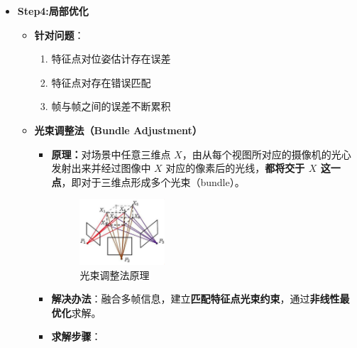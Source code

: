 \documentclass[../main.tex]{subfiles}
\begin{document}
\begin{enumerate}
\begin{itemize}
\begin{enumerate}
\begin{itemize}
                    \item \textbf{Step4:局部优化} 
                        \begin{itemize}
                            \item \textbf{针对问题}：
                                \begin{enumerate}
                                    \item 特征点对位姿估计存在误差
                                    \item 特征点对存在错误匹配
                                    \item 帧与帧之间的误差不断累积
                                \end{enumerate}
                                    \item \textbf{光束调整法（Bundle Adjustment）}
                                    \begin{itemize}
                                        \item \textbf{原理：}对场景中任意三维点 $X$，由从每个视图所对应的摄像机的光心发射出来并经过图像中 $X$ 对应的像素后的光线，\textbf{都将交于 $X$ 这一点}，即对于三维点形成多个光束（bundle）。
    \begin{figure}[H]
        \centering
        \includegraphics[width=0.34\textwidth]{images/ba.png}
        \caption{光束调整法原理}
    \end{figure}
                                        \item \textbf{解决办法}：融合多帧信息，建立\textbf{匹配特征点光束约束}，通过\textbf{非线性最优化}求解。
                                        \item \textbf{求解步骤}：
                                        \begin{figure}[H]

\end{figure}
\end{itemize}
\end{itemize}
\end{itemize}
\end{enumerate}
\end{itemize}
\end{enumerate}
\end{document}
